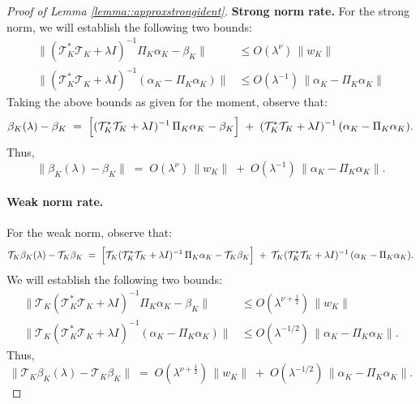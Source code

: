 \documentclass[11pt]{article}
\theoremstyle{plain}
\theoremstyle{definition}
\theoremstyle{remark}
\theoremstyle{definition}
\begin{document}
\begin{proof}[Proof of Lemma \ref{lemma::approxstrongident}]
 \textbf{Strong norm rate.} For the strong norm, we will establish the following two bounds:
\begin{align}
     \|(\mathcal{T}_{K}^* \mathcal{T}_{K} + \lambda I)^{-1} \Pi_{K} \alpha_K - \beta_{K} \|& \leq O(\lambda^\nu)\,\|w_{K}\| \\
     \|(\mathcal{T}_{K}^* \mathcal{T}_{K} + \lambda I)^{-1} (\alpha_K - \Pi_{K} \alpha_K)\| &\leq O(\lambda^{-1})\,\|\alpha_K - \Pi_{K} \alpha_K\|
\end{align}
Taking the above bounds as given for the moment, observe that:
\[
\beta_{K}(\lambda) - \beta_{K}
\;=\;
\Bigl[(\mathcal{T}_{K}^* \mathcal{T}_{K} + \lambda I)^{-1}\,\Pi_{K} \alpha_K - \beta_{K}\Bigr]
\;+\;
(\mathcal{T}_{K}^* \mathcal{T}_{K}  + \lambda I)^{-1}\,(\alpha_K - \Pi_{K} \alpha_K).
\]
Thus,
\[
\|\beta_{K}(\lambda) - \beta_{K}\|
\;=\; O(\lambda^\nu)\,\|w_{K}\|
\;+\;
O(\lambda^{-1})\,\|\alpha_K - \Pi_{K} \alpha_K\|.
\]
 

\paragraph{Weak norm rate.} For the weak norm, observe that:
\[
\mathcal{T}_{K} \beta_{K}(\lambda) - \mathcal{T}_{K}  \beta_{K}
\;=\;
\Bigl[\mathcal{T}_{K} (\mathcal{T}_{K}^* \mathcal{T}_{K} + \lambda I)^{-1}\,\Pi_{K} \alpha_K - \mathcal{T}_{K} \beta_{K}\Bigr] 
\;+\;
\mathcal{T}_{K} (\mathcal{T}_{K}^* \mathcal{T}_{K}  + \lambda I)^{-1}\,(\alpha_K - \Pi_{K} \alpha_K).
\]
We will establish the following two bounds:
\begin{align}
     \|\mathcal{T}_{K}(\mathcal{T}_{K}^* \mathcal{T}_{K} + \lambda I)^{-1} \Pi_{K} \alpha_K - \beta_{K} \|& \leq O(\lambda^{\nu + \frac{1}{2}})\,\|w_{K}\| \\
     \|\mathcal{T}_{K}(\mathcal{T}_{K}^* \mathcal{T}_{K} + \lambda I)^{-1} (\alpha_K - \Pi_{K} \alpha_K)\| &\leq O(\lambda^{-1/2})\,\|\alpha_K - \Pi_{K} \alpha_K\|.
\end{align}
Thus,
\[
\|\mathcal{T}_{K}\beta_{K}(\lambda) - \mathcal{T}_{K}\beta_{K}\|
\;=\; O(\lambda^{\nu + \frac{1}{2}})\,\|w_{K}\|
\;+\;
O(\lambda^{-1/2})\,\|\alpha_K - \Pi_{K} \alpha_K\|.
\]
 




\end{proof}
\end{document}
